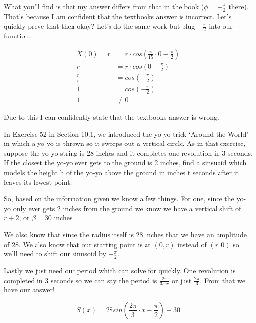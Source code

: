 \documentclass[10pt,letterpaper]{amspset}
\begin{document}
\begin{solution}
    What you'll find is that my answer differs from that in the book ($\phi = -\frac{\pi}{2}$ there). That's because I am confident that the textbooks answer is incorrect. Let's quickly prove that then okay? Let's do the same work but plug $-\frac{\pi}{2}$ into our function.
    
    \begin{align}
    X(0) = r &= r \cdot cos \left( \frac{\pi}{15} \cdot 0 -\frac{\pi}{2} \right) \\
    r &= r \cdot cos \left(0 - \frac{\pi}{2} \right) \\
    \frac{r}{r} &= cos \left( -\frac{\pi}{2} \right) \\
    1 &= cos \left( -\frac{\pi}{2} \right) \\
    1 &\neq 0 
    \end{align}
    
    Due to this I can confidently state that the textbooks answer is wrong. 
\end{solution}


\pagebreak


\begin{problem}[5]
    In Exercise 52 in Section 10.1, we introduced the yo-yo trick ‘Around the World’ in which a yo-yo is thrown so it sweeps out a vertical circle. As in that exercise, suppose the yo-yo string is 28 inches and it completes one revolution in 3 seconds. If the closest the yo-yo ever gets to the ground is 2 inches, find a sinsuoid which models the height h of the yo-yo above the ground in inches t seconds after it leaves its lowest point. 
\end{problem}

\begin{solution}

    So, based on the information given we know a few things. For one, since the yo-yo only ever gets 2 inches from the ground we know we have a vertical shift of $r + 2$, or $\beta = 30$ inches. \medskip
    
    We also know that since the radius itself is $28$ inches that we have an amplitude of 28. We also know that our starting point is at $(0,r)$ instead of $(r,0)$ so we'll need to shift our sinusoid by $-\frac{\pi}{2}$. \medskip 
    
    Lastly we just need our period which can solve for quickly. One revolution is completed in 3 seconds so we can say the period is $\frac{2\pi}{3sec}$ or just $\frac{2\pi}{3}$. From that we have our answer! 
    
    \[\boxed{S(x) = 28 sin \left( \frac{2\pi}{3} \cdot x - \frac{\pi}{2} \right) + 30 } \]
\end{solution}
\end{document}
